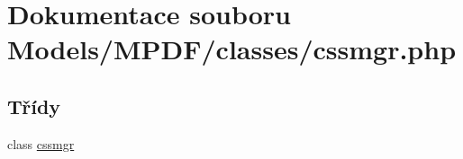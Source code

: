 \hypertarget{cssmgr_8php}{\section{Dokumentace souboru Models/\-M\-P\-D\-F/classes/cssmgr.php}
\label{cssmgr_8php}
}
\subsection*{Třídy}
\begin{DoxyCompactItemize}
\item 
class \hyperlink{classcssmgr}{cssmgr}
\end{DoxyCompactItemize}
